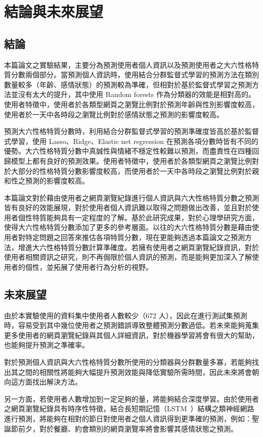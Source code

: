 \chapter{結論與未來展望}
\section{結論}
{
本篇論文之實驗結果，主要分為預測使用者個人資訊以及預測使用者之大六性格特質分數兩個部分。當預測個人資訊時，使用結合分群監督式學習的預測方法在類別數量較多（年齡、感情狀態）的預測較為準確，但相對於基於監督式學習之預測方法並沒有太大的提升，其中使用 Random forests 作為分類器的效能是相對高的。使用者特徵中，使用者於各類型網頁之瀏覽比例對於預測年齡與性別影響度較高，使用者於一天中各時段之瀏覽比例對於感情狀態之預測的影響度較高。\par

預測大六性格特質分數時，利用結合分群監督式學習的預測準確度皆高於基於監督式學習，使用 Lasso、Ridge、Elastic net regression 在預測各項分數時皆有不同的優勢。大六性格特質分數中真誠性與情緒不穩定性較難以預測，而盡責性在四種回歸模型上都有良好的預測效果。使用者特徵中，使用者於各類型網頁之瀏覽比例對於大部分的性格特質分數影響度較高，而使用者於一天中各時段之瀏覽比例對於親和性之預測的影響度較高。\par

本篇論文對於藉由使用者之網頁瀏覽紀錄進行個人資訊與六大性格特質分數之預測皆有良好的效能展現，對於使用者個人資訊難以取得之問題做出改善，並且對於使用者個性特質能夠具有一定程度的了解。基於此研究成果，對於心理學研究方面，使得大六性格特質分數添加了更多的參考層面。以往的大六性格特質分數是藉由使用者對特定問題之回答來推估各項特質分數，現在更能夠透過本篇論文之預測方法，增進大六性格特質分數計算準確度。若擁有使用者之網頁瀏覽紀錄資訊，對於使用者相關資訊之研究，則不再侷限於個人資訊的預測，而是能夠更加深入了解使用者的個性，並拓展了使用者行為分析的視野。
}
\clearpage

\section{未來展望}
{
由於本實驗使用的資料集中使用者人數較少（672 人），因此在進行測試集預測時，容易受到其中幾位使用者之預測錯誤導致整體預測分數過低。若未來能夠蒐集更多使用者的網頁瀏覽紀錄與其個人詳細資訊，對於機器學習將會有很大的幫助，也能夠提升預測之準確率。\par

對於預測個人資訊與大六性格特質分數所使用的分類器與分群數量多寡，若能夠找出其之間的相關性將能夠大幅提升預測效能與降低實驗所需時間，因此未來將會朝向這方面找出解決方法。\par

另一方面，若使用者人數增加到一定足夠的量，將能夠結合深度學習。由於使用者之網頁瀏覽紀錄具有時序性特徵，結合長短期記憶（LSTM~\cite{hochreiter1997long}）結構之類神經網路進行預測，將能夠在相對的節日對使用者之個人資訊得到更準確的預測，例如：聖誕節前夕，對於餐廳、約會類別的網頁瀏覽率將會影響其感情狀態之預測。\par


}